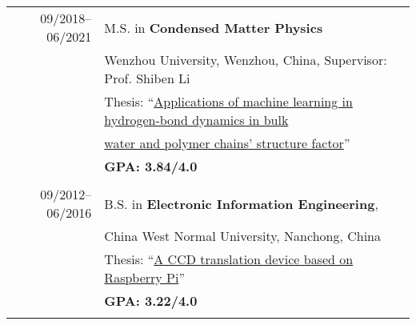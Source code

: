 \documentclass[a4paper,10pt]{article} %
\begin{document}
\begin{tabular}{r|l}	
09/2018--06/2021 				    & M.S. in \textbf{Condensed Matter Physics}\\
                                    & Wenzhou University, Wenzhou, China, Supervisor: Prof. Shiben Li\\
                                    & Thesis: “\href{https://nbviewer.jupyter.org/github/HuangJiaLian/DataBase0/blob/master/uPic/2021_07_24_12_HuangJieBiYeDaBian.pdf}{Applications of machine learning in hydrogen-bond dynamics in bulk} \\& \href{https://nbviewer.jupyter.org/github/HuangJiaLian/DataBase0/blob/master/uPic/2021_07_24_12_HuangJieBiYeDaBian.pdf}{water and polymer chains’ structure factor}”\\
                                    & \textbf{GPA: 3.84/4.0}\\

%


\multicolumn{2}{c}{} \\	%

09/2012--06/2016                    & B.S. in \textbf{Electronic Information Engineering}, \\                    & China West Normal University, Nanchong, China\\
					 & Thesis: “\href{https://nbviewer.jupyter.org/github/HuangJiaLian/DataBase0/blob/master/uPic/2021_07_24_13_CCD_translation_device.pdf}{A CCD translation device based on Raspberry Pi}”	\\
					 & \textbf{GPA: 3.22/4.0}\\
\multicolumn{2}{c}{} \\	%
\end{tabular}

%	
%
\end{document}
